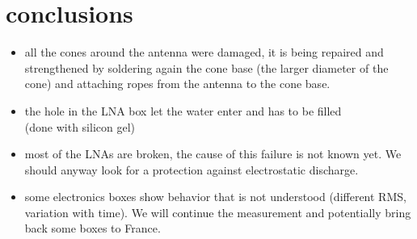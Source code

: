 \section{conclusions}
\begin{itemize}
\item  all the  cones around  the antenna  were damaged,  it  is being
  repaired  and strengthened  by soldering  again the  cone  base (the
  larger diameter of the cone) and attaching ropes from the antenna to
  the cone base.
\item the hole in the LNA box let the water enter and has to be filled
  \\ (done with silicon gel)
\item most  of the LNAs are broken,  the cause of this  failure is not
  known  yet.   We  should  anyway  look  for   a  protection  against
  electrostatic discharge.
\item  some electronics  boxes show  behavior that  is  not understood
  (different  RMS,  variation  with   time).   We  will  continue  the
  measurement and potentially bring back some boxes to France.
\end{itemize}

